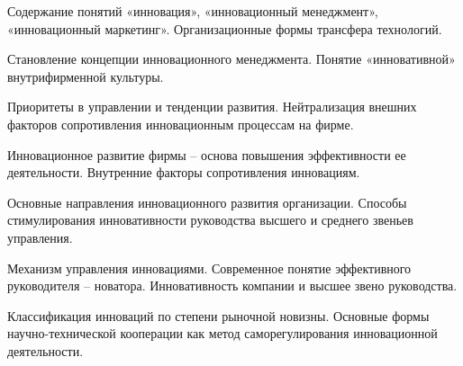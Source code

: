 \documentclass[
	14pt,
	a4paper,
	]
	{scrartcl}
\begin{document}
\shapk
{}
\setcounter{zad}{0}

\vfill
\z Содержание понятий «инновация», «инновационный менеджмент», «инновационный маркетинг».
 \vfill
\z Организационные формы трансфера технологий. \vfill

\vfill

\newpage


\shapk
{}
\setcounter{zad}{0}

\vfill
\z Становление концепции инновационного менеджмента.
 \vfill
\z Понятие «инновативной» внутрифирменной культуры.
 \vfill

\vfill

\newpage


\shapk
{}
\setcounter{zad}{0}

\vfill
\z Приоритеты в управлении и тенденции развития.
 \vfill
\z Нейтрализация внешних факторов сопротивления инновационным процессам на фирме.
 \vfill

\vfill

\newpage


\shapk
{}
\setcounter{zad}{0}

\vfill
\z Инновационное развитие фирмы – основа повышения эффективности ее деятельности.
 \vfill
\z Внутренние факторы сопротивления инновациям.
 \vfill

\vfill

\newpage


\shapk
{}
\setcounter{zad}{0}

\vfill
\z Основные направления инновационного развития организации.
 \vfill
\z Способы стимулирования инновативности руководства высшего и среднего звеньев управления.
 \vfill

\vfill

\newpage


\shapk
{}
\setcounter{zad}{0}

\vfill
\z Механизм управления инновациями.
 \vfill
\z Современное понятие эффективного руководителя – новатора. Инновативность компании и высшее звено руководства.
 \vfill

\vfill

\newpage


\shapk
{}
\setcounter{zad}{0}

\vfill
\z Классификация инноваций по степени рыночной новизны.
 \vfill
\z Основные формы научно-технической кооперации как метод саморегулирования инновационной деятельности.
 \vfill
\end{document}
